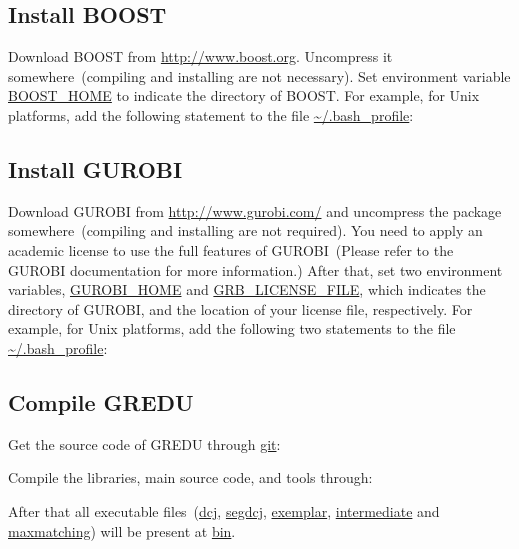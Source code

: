 \documentclass[11pt, a4paper]{article}
\begin{document}
\subsection{Install BOOST}
Download BOOST from \url{http://www.boost.org}. Uncompress it
somewhere~(compiling and installing are not necessary). Set environment
variable \url{BOOST_HOME} to indicate the directory of BOOST.
For example, for Unix platforms, add the following
statement to the file \url{~/.bash_profile}:


\subsection{Install GUROBI}
Download GUROBI from \url{http://www.gurobi.com/} and uncompress the
package somewhere~(compiling and installing are not required).
You need to apply an academic license to use
the full features of GUROBI~(Please refer to the GUROBI documentation for more information.)
After that, set two environment
variables, \url{GUROBI_HOME} and \url{GRB_LICENSE_FILE}, which indicates the directory of GUROBI, and
the location of your license file, respectively.
For example, for Unix platforms, add the following
two statements to the file \url{~/.bash_profile}:


\subsection{Compile GREDU}
Get the source code of GREDU through \url{git}:


Compile the libraries, main source code, and tools through:


After that all executable files~(\url{dcj}, \url{segdcj}, \url{exemplar},
\url{intermediate} and \url{maxmatching}) will be present at \url{bin}.
\end{document}
